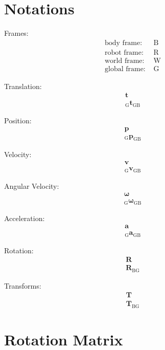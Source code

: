 \documentclass{article}
\renewcommand{\Vec}[1]{\mathbf{#1}}
\newcommand{\Mat}[1]{\mathbf{#1}}
\newcommand{\rot}{\Mat{R}}
\newcommand{\body}{{\text{B}}}
\newcommand{\robot}{{\text{R}}}
\newcommand{\world}{{\text{W}}}
\newcommand{\glob}{{\text{G}}}
\newcommand{\KineNotationP}[3]{{{#1}_{#2#3}}}
\newcommand{\KineNotationF}[4]{{{{}_{#4}} {#1}_{#2#3}}}
\newcommand{\trans}{{\Vec{t}}}
\newcommand{\Trans}[3]{{\KineNotationF{\trans}{#1}{#2}{#3}}}
\newcommand{\pos}{{\Vec{p}}}
\newcommand{\Pos}[3]{{\KineNotationF{\pos}{#1}{#2}{#3}}}
\newcommand{\vel}{{\Vec{v}}}
\newcommand{\Vel}[3]{{\KineNotationF{\vel}{#1}{#2}{#3}}}
\newcommand{\angvel}{{\boldsymbol{\omega}}}
\newcommand{\AngVel}[3]{{\KineNotationF{\angvel}{#1}{#2}{#3}}}
\newcommand{\acc}{{\Vec{a}}}
\newcommand{\Acc}[3]{{\KineNotationF{\acc}{#1}{#2}{#3}}}
\newcommand{\rot}{{\Mat{R}}}
\newcommand{\Rot}[2]{{\KineNotationP{\rot}{#1}{#2}}}
\newcommand{\tf}{{\Mat{T}}}
\newcommand{\Tf}[2]{{\KineNotationP{\tf}{#1}{#2}}}
\begin{document}
\tableofcontents
\newpage


\section{Notations}

Frames:
\begin{align}
  \text{body frame: } & \body \\
  \text{robot frame: } & \robot \\
  \text{world frame: } & \world \\
  \text{global frame: } & \glob
\end{align}

Translation:
\begin{align}
  \trans \\
  \Trans{\glob}{\body}{\glob}
\end{align}


Position:
\begin{align}
  \pos \\
  \Pos{\glob}{\body}{\glob}
\end{align}


Velocity:
\begin{align}
  \vel \\
  \Vel{\glob}{\body}{\glob}
\end{align}


Angular Velocity:
\begin{align}
  \angvel \\
  \AngVel{\glob}{\body}{\glob}
\end{align}


Acceleration:
\begin{align}
  \acc \\
  \Acc{\glob}{\body}{\glob}
\end{align}

Rotation:
\begin{align}
  \rot \\
  \Rot{\body}{\glob}
\end{align}


Transforms:
\begin{align}
  \tf \\
  \Tf{\body}{\glob}
\end{align}



\section{Rotation Matrix}
\end{document}
